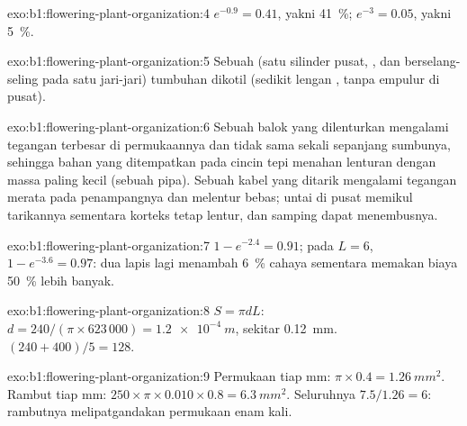 \begin{solution}{exo:b1:flowering-plant-organization:4}
$e^{-0.9} = 0.41$, yakni \qty{41}{\%}; $e^{-3} = 0.05$, yakni
\qty{5}{\%}.
\end{solution}

\begin{solution}{exo:b1:flowering-plant-organization:5}
Sebuah  (satu silinder pusat, ,  dan 
berselang-seling pada satu jari-jari) tumbuhan dikotil (sedikit lengan
, tanpa empulur di pusat).
\end{solution}

\begin{solution}{exo:b1:flowering-plant-organization:6}
Sebuah balok yang dilenturkan mengalami tegangan terbesar di
permukaannya dan tidak sama sekali sepanjang sumbunya, sehingga bahan
yang ditempatkan pada cincin tepi menahan lenturan dengan massa paling
kecil (sebuah pipa). Sebuah kabel yang ditarik mengalami tegangan merata
pada penampangnya dan melentur bebas; untai di pusat memikul tarikannya
sementara korteks tetap lentur, dan  samping dapat menembusnya.
\end{solution}

\begin{solution}{exo:b1:flowering-plant-organization:7}
$1 - e^{-2.4} = 0.91$; pada $L = 6$, $1 - e^{-3.6} = 0.97$: dua lapis
 lagi menambah \qty{6}{\%} cahaya sementara memakan biaya
\qty{50}{\%}  lebih banyak.
\end{solution}

\begin{solution}{exo:b1:flowering-plant-organization:8}
$S = \pi d L$: $d = 240/(\pi\times 623\,000) = \qty{1.2e-4}{m}$, sekitar
\qty{0.12}{mm}. $(240 + 400)/5 = 128$.
\end{solution}

\begin{solution}{exo:b1:flowering-plant-organization:9}
Permukaan  tiap mm: $\pi\times 0.4 = \qty{1.26}{mm^2}$. Rambut tiap
mm: $250\times\pi\times 0.010\times 0.8 = \qty{6.3}{mm^2}$. Seluruhnya
$7.5/1.26 = 6$: rambutnya melipatgandakan permukaan enam kali.
\end{solution}

